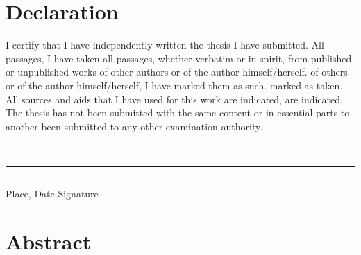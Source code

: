 \documentclass[a4paper,12pt]{report}%
\renewcommand{\\}{\vspace*{0.5\baselineskip} \newline}
\begin{document}
\newpage
\chapter*{Declaration}
I certify that I have independently written the thesis I have submitted. All passages,
I have taken all passages, whether verbatim or in spirit, from published or unpublished works of other authors or of the author himself/herself.
of others or of the author himself/herself, I have marked them as such.
marked as taken. All sources and aids that I have used for this work are indicated,
are indicated. The thesis has not been submitted with the same content or in essential parts to another
been submitted to any other examination authority.

~\\
~\\
\rule{0.35\textwidth}{0.4pt} \hspace*{3cm} \rule{0.45\textwidth}{0.4pt} \newline
Place, Date	\hspace*{6.3cm}	Signature

\newpage
\chapter*{Abstract}
\end{document}
